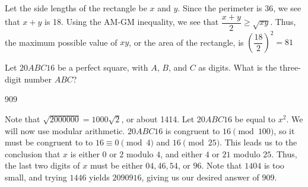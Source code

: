 \documentclass[11pt]{article}
\begin{document}
\begin{solution}
Let the side lengths of the rectangle be $x$ and $y$. Since the perimeter is 36, we see that $x+y$ is 18. Using the AM-GM inequality, we see that $\dfrac{x+y}{2} \geq \sqrt{xy}$. Thus, the maximum possible value of $xy$, or the area of the rectangle, is $\left(\dfrac{18}{2}\right)^2=\boxed{81}$ 
\end{solution}

\begin{problem}
Let $20ABC16$ be a perfect square, with $A$, $B$, and $C$ as digits. What is the three-digit number $ABC$?
\end{problem}

\begin{answer}
909
\end{answer}

\begin{solution}    
Note that $\sqrt{2000000} = 1000\sqrt{2}$, or about 1414. Let $20ABC16$ be equal to $x^2$. We will now use modular arithmetic. 
$20ABC16$ is congruent to $16 \pmod{100}$, so it must be congruent to to $16 \equiv 0 \pmod{4}$ and $16 \pmod{25}$. This leads us to the conclusion that $x$ is either $0$ or $2$ modulo $4$, and either $4$ or $21$ modulo $25$. Thus, the last two digits of $x$ must be either 
$04, 46, 54$, or $96$. Note that $1404$ is too small, and trying $1446$ yields $2090916$, giving us our desired answer of $\boxed{909}$.
\end{solution}
\end{document}
